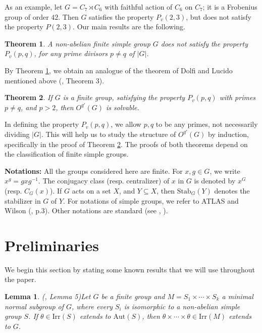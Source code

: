 \documentclass[11pt, a4paper]{article}
\numberwithin{equation}{section}
\theoremstyle{plain} %
\newtheorem{lemma}[theorem]{Lemma}
\newtheorem{Theorem}{Theorem}
\begin{document}
\vskip5mm
As an example, let $G=C_7\rtimes C_6$ with faithful action of $C_6$ on $C_7$; it is a Frobenius group of order $42$. Then $G$ satisfies the property $P_v(2,3)$, but does not satisfy the property $P(2,3)$. 
\vskip5mm
Our main results are the following. 

\begin{Theorem}\label{thma}
A non-abelian finite simple group $G$ does not satisfy the property $P_v(p,q)$, for any prime divisors $p\neq q$ of $|G|$.
\end{Theorem}

\vskip3mm
\noindent
By Theorem \ref{thma}, we obtain an analogue of the theorem of Dolfi and Lucido mentioned above (\cite{MR1826493}, Theorem 3). %
\vskip-5mm\noindent
\begin{Theorem}\label{thmb}
If $G$ is a finite group, satisfying the property $P_v(p,q)$ with primes $p\neq q$, and $p>2$, then $O^{q'}(G)$ is solvable.
\end{Theorem}

In defining the property $P_v(p,q)$, we allow $p,q$ to be any primes, not necessarily dividing $|G|$. This will help us to study the structure of $O^{q'}(G)$ by induction, specifically in the proof of Theorem \ref{thmb}. The proofs of both theorems depend on the classification of finite simple groups. 




\vskip2mm
\noindent\textbf{Notations:}
\noindent All the groups considered here are finite. For $x,g\in G$, we write $x^g=gxg^{-1}$. The conjugacy class (resp. centralizer) of $x$ in $G$ is denoted by $x^G$ (resp. $C_G(x)$). If $G$ acts on a set $X$, and $Y\subseteq X$, then $\mathrm{Stab}_{G}(Y)$ denotes the stabilizer in $G$ of $Y$. For notations of simple groups, we refer to ATLAS \cite{MR827219} and Wilson (\cite{MR2562037}, p.3). Other notations are standard (see \cite{MR1280461}, \cite{MR569209}).


\section{Preliminaries}
We begin this section by stating some known results that we will use throughout the paper.


\begin{lemma}(\cite{MR2262862}, Lemma 5)\label{lem2}
Let $G$ be a finite group and $M=S_1\times\cdots\times S_k $ a minimal normal subgroup of $G$, where every $S_i$ is isomorphic to a non-abelian simple group $S$. If $\theta\in \mathrm{Irr}(S)$ extends to $\mathrm{Aut}(S)$, then $\theta\times\cdots\times \theta\in \mathrm{Irr}(M)$ extends to $G$.
\end{lemma}
\end{document}
